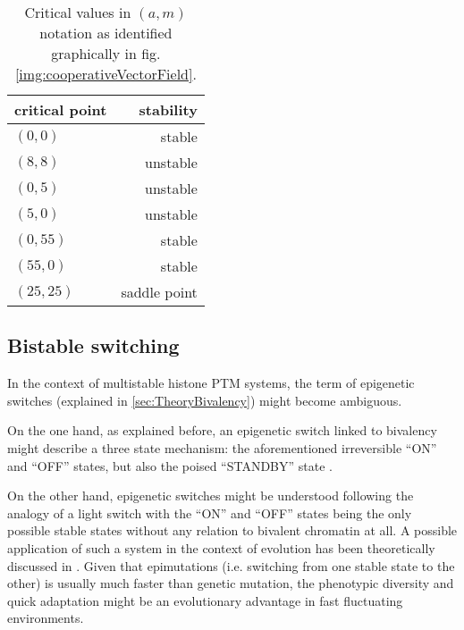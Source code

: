             \begin{table}[htbp!]
                \caption{Critical values in $(a,m)$ notation as identified graphically in fig. \ref{img:cooperativeVectorField}.}
                \begin{center}
                    \begin{tabular}{l r}
                        \hline
                        \textbf{critical point} & \textbf{stability} \\
                        \hline
                        $(0,0)$     & stable \\
                        $(8,8)$     & unstable \\
                        $(0,5)$     & unstable \\
                        $(5,0)$     & unstable \\
                        $(0,55)$    & stable \\
                        $(55,0)$    & stable \\
                        $(25,25)$   & saddle point \\
                        \hline
                    \end{tabular}
                \end{center}
                \label{tab:cooperativeCriticalValues}
            \end{table}
        \subsection{Bistable switching}
        \label{sec:TheoBistableSwitching}

        In the context of multistable histone PTM systems, the term of epigenetic switches (explained in \ref{sec:TheoryBivalency}) might become ambiguous.

        On the one hand, as explained before, an epigenetic switch linked to bivalency might describe a three state mechanism: the aforementioned irreversible “ON” and “OFF” states, but also the poised “STANDBY” state \cite{Hoffmann2015BivalencyReview}.

        On the other hand, epigenetic switches might be understood following the analogy of a light switch with the “ON” and “OFF” states being the only possible stable states without any relation to bivalent chromatin at all. A possible application of such a system in the context of evolution has been theoretically discussed in \cite{gomez2019epigenetic}. Given that epimutations (i.e. switching from one stable state to the other) is usually much faster than genetic mutation, the phenotypic diversity and quick adaptation might be an evolutionary advantage in fast fluctuating environments.\\

